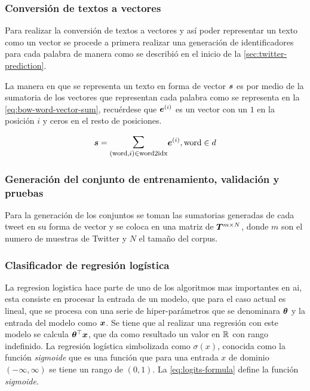 \subsubsection{Conversión de textos a vectores}
Para realizar la conversión de textos a vectores y así poder representar un texto como un vector se procede a primera realizar una generación de identificadores para cada palabra de manera como se describió en el inicio de la \cref{sec:twitter-prediction}.

La manera en que se representa un texto en forma de vector ${\bm{s}}$ es por medio de la sumatoria de los vectores que representan cada palabra como se representa en la \cref{eq:bow-word-vector-sum}, recuérdese que ${\bm{e}}^{(i)}$ es un vector con un $1$ en la posición $i$ y ceros en el resto de posiciones.

\begin{equation} \label{eq:bow-word-vector-sum}
  \vs = \mathlarger{\mathlarger{\sum}}_{(\text{word}, i) \in \text{word2idx}} \ve^{(i)}, \text{word} \in d
\end{equation}

\subsubsection{Generación del conjunto de entrenamiento, validación y pruebas}
Para la generación de los conjuntos se toman las sumatorias generadas de cada tweet en su forma de vector y se coloca en una matriz de ${\bm{T}}^{m \times N}$, donde $m$ son el numero de muestras de Twitter y $N$ el tamaño del \gls{corpus}.

\subsubsection{Clasificador de regresión logística}
La regresion logistica hace parte de uno de los algoritmos mas importantes en \gls{ai}, esta consiste en procesar la entrada de un modelo, que para el caso actual es lineal, que se procesa con una serie de hiper-parámetros que se denominara ${\bm{\theta}}$ y la entrada del modelo como ${\bm{x}}$. Se tiene que al realizar una regresión con este modelo se calcula ${\bm{\theta}}^{\top} {\bm{x}}$, que da como resultado un valor en $\mathbb{R}$ con rango indefinido. La regresión logística simbolizada como $\sigma(x)$, conocida como la función \emph{sigmoide} que es una función que para una entrada $x$ de dominio $(-\infty, \infty)$ se tiene un rango de $(0, 1)$. La \cref{eq:logits-formula} define la función \emph{sigmoide}.

